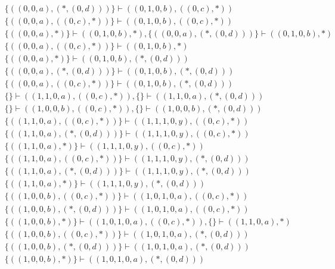 \begin{align*}
	 & \qquad \{ ((0, 0, a), (*, (0, d))) \} \vdash ((0, 1, 0, b), ((0, c), *)) \\ 
	 & \qquad \{ ((0, 0, a), ((0, c), *)) \} \vdash ((0, 1, 0, b), ((0, c), *)) \\ 
	 & \qquad \{ ((0, 0, a), *) \} \vdash ((0, 1, 0, b), *), \{ ((0, 0, a), (*, (0, d))) \} \vdash ((0, 1, 0, b), *) \\ 
	 & \qquad \{ ((0, 0, a), ((0, c), *)) \} \vdash ((0, 1, 0, b), *) \\ 
	 & \qquad \{ ((0, 0, a), *) \} \vdash ((0, 1, 0, b), (*, (0, d))) \\ 
	 & \qquad \{ ((0, 0, a), (*, (0, d))) \} \vdash ((0, 1, 0, b), (*, (0, d))) \\ 
	 & \qquad \{ ((0, 0, a), ((0, c), *)) \} \vdash ((0, 1, 0, b), (*, (0, d))) \\ 
	 & \qquad \{  \} \vdash ((1, 1, 0, a), ((0, c), *)), \{  \} \vdash ((1, 1, 0, a), (*, (0, d))) \\ 
	 & \qquad \{  \} \vdash ((1, 0, 0, b), ((0, c), *)), \{  \} \vdash ((1, 0, 0, b), (*, (0, d))) \\ 
	 & \qquad \{ ((1, 1, 0, a), ((0, c), *)) \} \vdash ((1, 1, 1, 0, y), ((0, c), *)) \\ 
	 & \qquad \{ ((1, 1, 0, a), (*, (0, d))) \} \vdash ((1, 1, 1, 0, y), ((0, c), *)) \\ 
	 & \qquad \{ ((1, 1, 0, a), *) \} \vdash ((1, 1, 1, 0, y), ((0, c), *)) \\ 
	 & \qquad \{ ((1, 1, 0, a), ((0, c), *)) \} \vdash ((1, 1, 1, 0, y), (*, (0, d))) \\ 
	 & \qquad \{ ((1, 1, 0, a), (*, (0, d))) \} \vdash ((1, 1, 1, 0, y), (*, (0, d))) \\ 
	 & \qquad \{ ((1, 1, 0, a), *) \} \vdash ((1, 1, 1, 0, y), (*, (0, d))) \\ 
	 & \qquad \{ ((1, 0, 0, b), ((0, c), *)) \} \vdash ((1, 0, 1, 0, a), ((0, c), *)) \\ 
	 & \qquad \{ ((1, 0, 0, b), (*, (0, d))) \} \vdash ((1, 0, 1, 0, a), ((0, c), *)) \\ 
	 & \qquad \{ ((1, 0, 0, b), *) \} \vdash ((1, 0, 1, 0, a), ((0, c), *)), \{  \} \vdash ((1, 1, 0, a), *) \\ 
	 & \qquad \{ ((1, 0, 0, b), ((0, c), *)) \} \vdash ((1, 0, 1, 0, a), (*, (0, d))) \\ 
	 & \qquad \{ ((1, 0, 0, b), (*, (0, d))) \} \vdash ((1, 0, 1, 0, a), (*, (0, d))) \\ 
	 & \qquad \{ ((1, 0, 0, b), *) \} \vdash ((1, 0, 1, 0, a), (*, (0, d))) \\ 

\end{align*}
